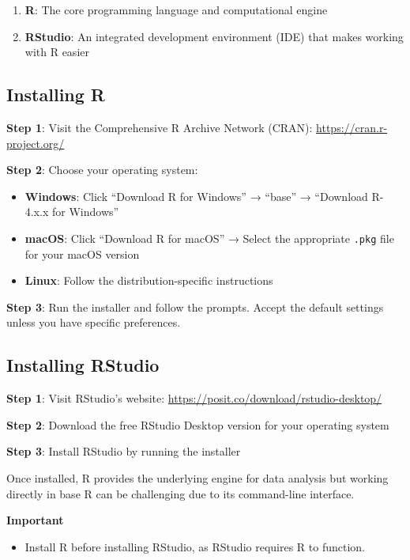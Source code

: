 \documentclass[
  10pt,
  b5paper,
  oneside]{book}
\providecommand{\tightlist}{%
  \setlength{\itemsep}{0pt}\setlength{\parskip}{0pt}}
\begin{document}
\begin{enumerate}
\def\labelenumi{\arabic{enumi}.}
\item
  \textbf{R}: The core programming language and computational engine
\item
  \textbf{RStudio}: An integrated development environment (IDE) that makes working with R easier
\end{enumerate}

\subsection{Installing R}\label{installing-r}

\textbf{Step 1}: Visit the Comprehensive R Archive Network (CRAN): \url{https://cran.r-project.org/}

\textbf{Step 2}: Choose your operating system:

\begin{itemize}
\item
  \textbf{Windows}: Click ``Download R for Windows'' → ``base'' → ``Download R-4.x.x for Windows''
\item
  \textbf{macOS}: Click ``Download R for macOS'' → Select the appropriate \texttt{.pkg} file for your macOS version
\item
  \textbf{Linux}: Follow the distribution-specific instructions
\end{itemize}

\textbf{Step 3}: Run the installer and follow the prompts. Accept the default settings unless you have specific preferences.

\subsection{Installing RStudio}\label{installing-rstudio}

\textbf{Step 1}: Visit RStudio's website: \url{https://posit.co/download/rstudio-desktop/}

\textbf{Step 2}: Download the free RStudio Desktop version for your operating system

\textbf{Step 3}: Install RStudio by running the installer

Once installed, R provides the underlying engine for data analysis but working directly in base R can be challenging due to its command-line interface.

\textbf{Important}

\begin{itemize}
\tightlist
\item
  Install R before installing RStudio, as RStudio requires R to function.
\end{itemize}
\end{document}
